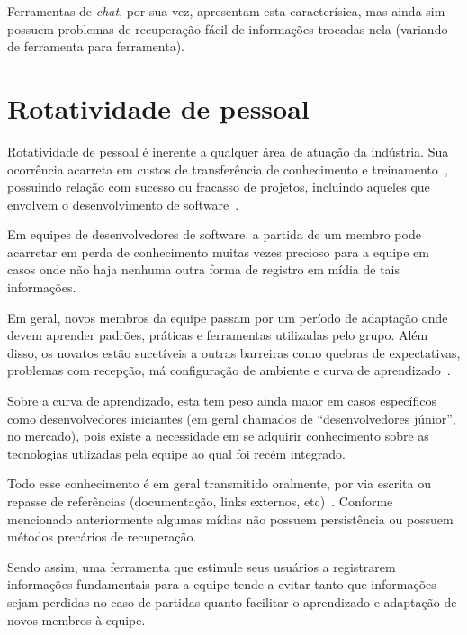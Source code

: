 Ferramentas de \textit{chat}, por sua vez, apresentam esta caracterísica, mas ainda sim possuem problemas de recuperação fácil de informações trocadas nela (variando de ferramenta para ferramenta).


\section{Rotatividade de pessoal}

Rotatividade de pessoal é inerente a qualquer área de atuação da indústria.
Sua ocorrência acarreta em custos de transferência de conhecimento e treinamento~\cite{Hall2008}, possuindo relação com sucesso ou fracasso de projetos, incluindo aqueles que envolvem o desenvolvimento de software~\cite{Hall2008}.

Em equipes de desenvolvedores de software, a partida de um membro pode acarretar em perda de conhecimento muitas vezes precioso para a equipe em casos onde não haja nenhuma outra forma de registro em mídia de tais informações.

Em geral, novos membros da equipe passam por um período de adaptação onde devem aprender padrões, práticas e ferramentas utilizadas pelo grupo. Além disso, os novatos estão sucetíveis a outras barreiras como quebras de expectativas, problemas com recepção, má configuração de ambiente e curva de aprendizado~\cite{Steinmacher2015}.

Sobre a curva de aprendizado, esta tem peso ainda maior em casos específicos como desenvolvedores iniciantes (em geral chamados de ``desenvolvedores júnior'', no mercado), pois existe a necessidade em se adquirir conhecimento sobre as tecnologias utlizadas pela equipe ao qual foi recém integrado.

Todo esse conhecimento é em geral transmitido oralmente, por via escrita ou repasse de referências (documentação, links externos, etc)~\cite{Storey2014, Olson2000, CubraniC2004}. Conforme mencionado anteriormente algumas mídias não possuem persistência ou possuem métodos precários de recuperação.

Sendo assim, uma ferramenta que estimule seus usuários a registrarem informações fundamentais para a equipe tende a evitar tanto que informações sejam perdidas no caso de partidas quanto facilitar o aprendizado e adaptação de novos membros à equipe.

